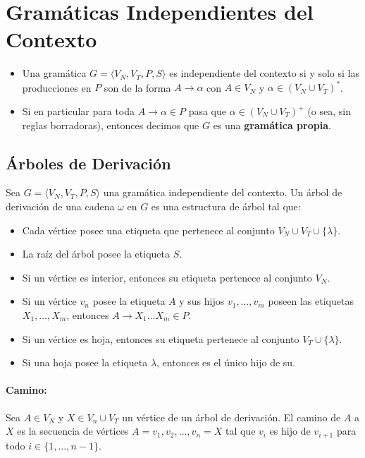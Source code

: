 \section{Gramáticas Independientes del Contexto}
\begin{itemize}
  \item[] Una gramática \(G = \langle V_N, V_T, P, S \rangle\) es independiente del contexto si y solo si las producciones en \(P\) son de la forma \(A\to\alpha\) con \(A \in V_N\) y \(\alpha \in (V_N \cup V_T)^*\).
  \item[] Si en particular para toda \(A\to\alpha\in P\) pasa que \(\alpha\in(V_N\cup V_T)^+\) (o sea, sin reglas borradoras), entonces decimos que \(G\) es una \textbf{gramática propia}.
\end{itemize}
\subsection{Árboles de Derivación}
Sea \(G = \langle V_N, V_T, P, S \rangle\) una gramática independiente del contexto. Un árbol de derivación de una cadena \(\omega\) en \(G\) es una estructura de árbol tal que:
\begin{itemize}
  \item Cada vértice posee una etiqueta que pertenece al conjunto \(V_N \cup V_T\cup\{\lambda\}\).
  \item La raíz del árbol posee la etiqueta \(S\).
  \item Si un vértice es interior, entonces su etiqueta pertenece al conjunto \(V_N\).
  \item Si un vértice \(v_n\) posee la etiqueta \(A\) y sus hijos \(v_1, \ldots, v_m\) poseen las etiquetas \(X_1, \ldots, X_m\), entonces \(A\to X_1\ldots X_m\in P\).
  \item Si un vértice es hoja, entonces su etiqueta pertenece al conjunto \(V_T\cup\{\lambda\}\).
  \item Si una hoja posee la etiqueta \(\lambda\), entonces es el único hijo de su.
\end{itemize}

\paragraph{Camino:} Sea \(A\in V_N\) y \(X\in V_n\cup V_T\) un vértice de un árbol de derivación. El camino de \(A\) a \(X\) es la secuencia de vértices \(A=v_1, v_2, \ldots, v_n=X\) tal que \(v_i\) es hijo de \(v_{i+1}\) para todo \(i\in\{1, \ldots, n-1\}\).

